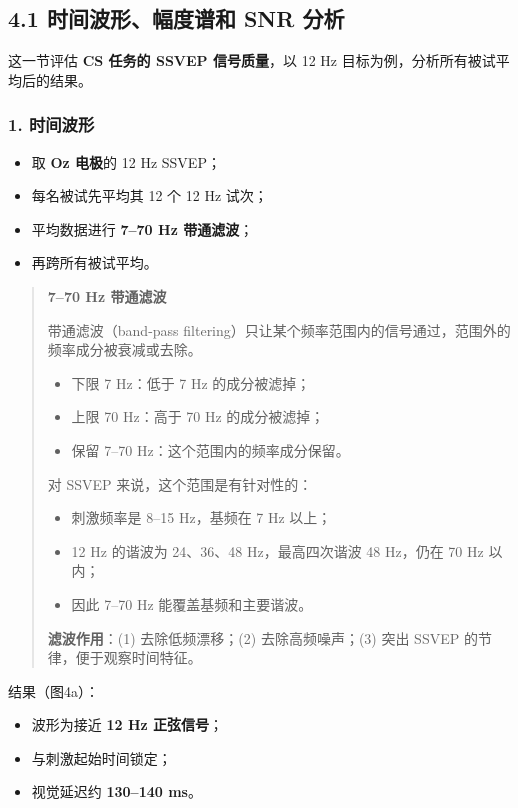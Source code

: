 \documentclass[12pt, a4paper]{ctexart}
\begin{document}
\subsection{4.1 时间波形、幅度谱和 SNR 分析}

这一节评估 \textbf{CS 任务的 SSVEP 信号质量}，以 12 Hz 目标为例，分析所有被试平均后的结果。

\subsubsection*{1. 时间波形}

\begin{itemize}
  \item 取 \textbf{Oz 电极}的 12 Hz SSVEP；
  \item 每名被试先平均其 12 个 12 Hz 试次；
  \item 平均数据进行 \textbf{7--70 Hz 带通滤波}；
  \item 再跨所有被试平均。
\end{itemize}

\begin{quote}
\textbf{7--70 Hz 带通滤波}

带通滤波（band-pass filtering）只让某个频率范围内的信号通过，范围外的频率成分被衰减或去除。

\begin{itemize}
  \item 下限 7 Hz：低于 7 Hz 的成分被滤掉；
  \item 上限 70 Hz：高于 70 Hz 的成分被滤掉；
  \item 保留 7--70 Hz：这个范围内的频率成分保留。
\end{itemize}

对 SSVEP 来说，这个范围是有针对性的：
\begin{itemize}
  \item 刺激频率是 8--15 Hz，基频在 7 Hz 以上；
  \item 12 Hz 的谐波为 24、36、48 Hz，最高四次谐波 48 Hz，仍在 70 Hz 以内；
  \item 因此 7--70 Hz 能覆盖基频和主要谐波。
\end{itemize}

\textbf{滤波作用}：(1) 去除低频漂移；(2) 去除高频噪声；(3) 突出 SSVEP 的节律，便于观察时间特征。
\end{quote}

结果（图4a）：

\begin{itemize}
  \item 波形为接近 \textbf{12 Hz 正弦信号}；
  \item 与刺激起始时间锁定；
  \item 视觉延迟约 \textbf{130--140 ms}。
\end{itemize}
\end{document}
